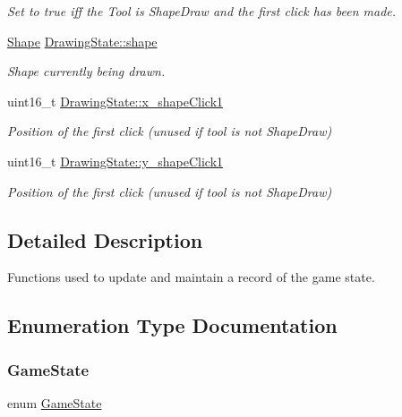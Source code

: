 \begin{DoxyCompactItemize}
\begin{DoxyCompactList}\small\item\em Set to true iff the Tool is Shape\+Draw and the first click has been made. \end{DoxyCompactList}\item 
\mbox{\hyperlink{group__canvas_ga55b506070847a13554f8b879c1bfb37c}{Shape}} \mbox{\hyperlink{group__game__state_ga303447063e848e099650034c763724d7}{Drawing\+State\+::shape}}
\begin{DoxyCompactList}\small\item\em Shape currently being drawn. \end{DoxyCompactList}\item 
uint16\+\_\+t \mbox{\hyperlink{group__game__state_ga2e0a42da2415d5aa408c1bb6f6f5e4c7}{Drawing\+State\+::x\+\_\+shape\+Click1}}
\begin{DoxyCompactList}\small\item\em Position of the first click (unused if tool is not Shape\+Draw) \end{DoxyCompactList}\item 
uint16\+\_\+t \mbox{\hyperlink{group__game__state_ga9c366a1e61752594e2755c01c9c43dd6}{Drawing\+State\+::y\+\_\+shape\+Click1}}
\begin{DoxyCompactList}\small\item\em Position of the first click (unused if tool is not Shape\+Draw) \end{DoxyCompactList}\end{DoxyCompactItemize}


\subsection{Detailed Description}
Functions used to update and maintain a record of the game state. 

\subsection{Enumeration Type Documentation}
\mbox{\label{group__game__state_ga7899b65f1ea0f655e4bbf8d2a5714285}} 
\subsubsection{\texorpdfstring{Game\+State}{GameState}}
{\footnotesize\ttfamily enum \mbox{\hyperlink{group__game__state_ga7899b65f1ea0f655e4bbf8d2a5714285}{Game\+State}}}



